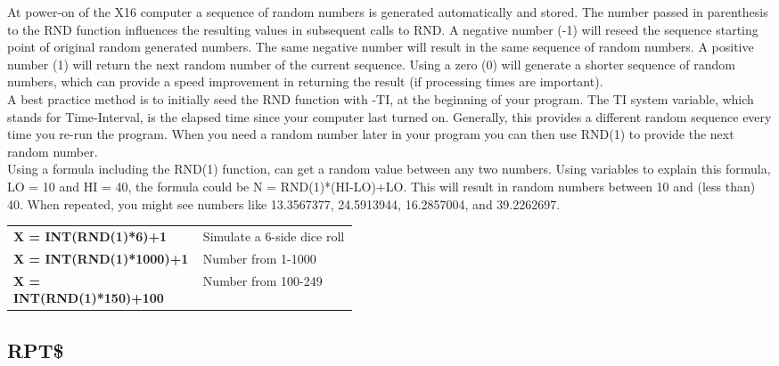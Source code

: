 At power-on of the X16 computer a sequence of random numbers is generated
automatically and stored.  The number passed in parenthesis to the {\ttfamily
RND} function influences the resulting values in subsequent calls to {\ttfamily
RND}.  A negative number (-1) will reseed the sequence starting point of
original random generated numbers.  The same negative number will result in the
same sequence of random numbers.  A positive number (1) will return the next
random number of the current sequence.  Using a zero (0) will generate a
shorter sequence of random numbers, which can provide a speed improvement in
returning the result (if processing times are important).\\

A best practice method is to initially seed the {\ttfamily RND} function with
{\ttfamily -TI}, at the beginning of your program.  The {\ttfamily TI} system
variable, which stands for Time-Interval, is the elapsed time since your
computer last turned on.  Generally, this provides a different random sequence
every time you re-run the program.  When you need a random number later in your
program you can then use RND(1) to provide the next random number.\\

Using a formula including the {\ttfamily RND(1)} function, can get a random
value between any two numbers.  Using variables to explain this formula,
{\ttfamily LO = 10} and {\ttfamily HI = 40}, the formula could be {\ttfamily N
= RND(1)*(HI-LO)+LO}.  This will result in random numbers between 10 and (less
than) 40. When repeated, you might see numbers like 13.3567377, 24.5913944,
16.2857004, and 39.2262697.\\

\begin{tabular}{l p{0.45\linewidth}}

	{\ttfamily\bfseries X = INT(RND(1)*6)+1} & Simulate a 6-side dice roll\\

	{\ttfamily\bfseries X = INT(RND(1)*1000)+1} & Number from 1-1000\\

	{\ttfamily\bfseries X = INT(RND(1)*150)+100} & Number from 100-249\\

\end{tabular}

\vspace{16pt}

\subsection{RPT\$}

